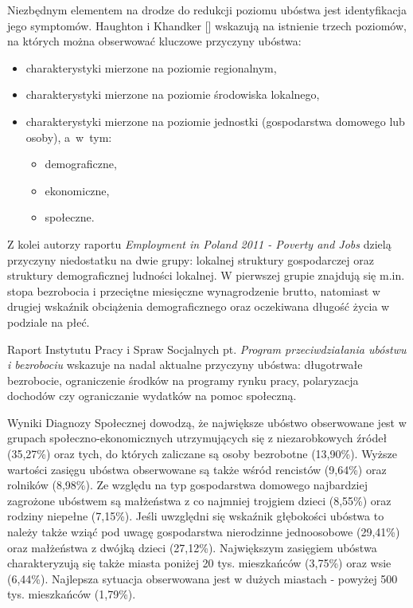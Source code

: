 Niezbędnym elementem na drodze do redukcji poziomu ubóstwa jest identyfikacja jego symptomów. Haughton i Khandker [\citeyear{haughton2009}] wskazują na istnienie trzech poziomów, na których można obserwować kluczowe przyczyny ubóstwa:

\begin{itemize}
\item charakterystyki mierzone na poziomie regionalnym,
\item charakterystyki mierzone na poziomie środowiska lokalnego,
\item charakterystyki mierzone na poziomie jednostki (gospodarstwa domowego lub osoby), a~w~tym:
\begin{itemize}
\item demograficzne,
\item ekonomiczne,
\item społeczne.
\end{itemize}
\end{itemize}

Z kolei autorzy raportu \emph{Employment in Poland 2011 - Poverty and Jobs} \citep{mpra2013} dzielą przyczyny niedostatku na dwie grupy: lokalnej struktury gospodarczej oraz struktury demograficznej ludności lokalnej. W pierwszej grupie znajdują się m.in. stopa bezrobocia i przeciętne miesięczne wynagrodzenie brutto, natomiast w drugiej wskaźnik obciążenia demograficznego oraz oczekiwana długość życia w podziale na płeć.

Raport Instytutu Pracy i Spraw Socjalnych pt. \emph{Program przeciwdziałania ubóstwu i bezrobociu} \citep{kabaj2000} wskazuje na nadal aktualne przyczyny ubóstwa: długotrwałe bezrobocie, ograniczenie środków na programy rynku pracy, polaryzacja dochodów czy ograniczanie wydatków na pomoc społeczną.

Wyniki Diagnozy Społecznej \citep{diagnoza-panek2011} dowodzą, że największe ubóstwo obserwowane jest w grupach społeczno-ekonomicznych utrzymujących się z niezarobkowych źródeł (35,27\%) oraz tych, do których zaliczane są osoby bezrobotne (13,90\%). Wyższe wartości zasięgu ubóstwa obserwowane są także wśród rencistów (9,64\%) oraz rolników (8,98\%). Ze względu na typ gospodarstwa domowego najbardziej zagrożone ubóstwem są małżeństwa z co najmniej trojgiem dzieci (8,55\%) oraz rodziny niepełne (7,15\%). Jeśli uwzględni się wskaźnik głębokości ubóstwa to należy także wziąć pod uwagę gospodarstwa nierodzinne jednoosobowe (29,41\%) oraz małżeństwa z dwójką dzieci (27,12\%). Największym zasięgiem ubóstwa charakteryzują się także miasta poniżej 20 tys. mieszkańców (3,75\%) oraz wsie (6,44\%). Najlepsza sytuacja obserwowana jest w dużych miastach - powyżej 500 tys. mieszkańców (1,79\%).

